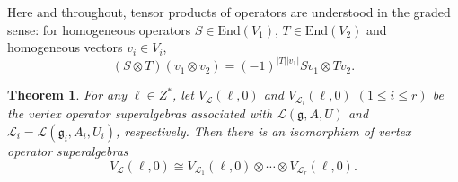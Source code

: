 \documentclass[12pt]{article}
\numberwithin{equation}{section}
\newtheorem{theorem}{Theorem}[section]
\theoremstyle{definition}
\theoremstyle{plain}
\newcommand{\End}{\mathrm{End }}
\newcommand{\fg}{\mathfrak{g}}
\newcommand{\cL}{\ensuremath{\mathcal{L}}}
\begin{document}
Here and throughout, tensor products of operators are understood in the graded sense: for homogeneous operators $S\in\End(V_1)$, $T\in\End(V_2)$ and homogeneous vectors $v_i\in V_i$,
\begin{equation*}
    (S\otimes T)(v_1\otimes v_2)=(-1)^{|T||v_1|}Sv_1\otimes Tv_2.
\end{equation*}

\begin{theorem}\label{thm:tensor_decomp}
For any $\ell\in Z^*$, let $V_{\cL}(\ell,0)$ and $V_{\cL_i}(\ell,0)$ $(1\le i\le r)$ be the vertex operator superalgebras associated with $\cL(\fg,A,U)$ and $\cL_i=\cL(\fg_i,A_i,U_i)$, respectively. Then there is an isomorphism of vertex operator superalgebras
\begin{equation*}
    V_{\cL}(\ell,0)\cong V_{\cL_1}(\ell,0)\otimes\cdots\otimes V_{\cL_r}(\ell,0).
\end{equation*}
\end{theorem}
\end{document}
